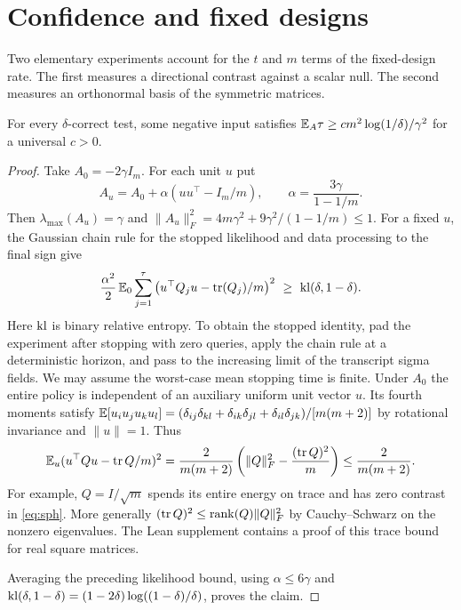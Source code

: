 \section{Confidence and fixed designs}\label{sec:fixed}

Two elementary experiments account for the \(t\) and \(m\) terms of the fixed-design rate. The first measures a directional contrast against a scalar null. The second measures an orthonormal basis of the symmetric matrices.

\begin{proposition}\label{prop:confidence}
For every \(\delta\)-correct test, some negative input satisfies
\(\mathbb E_A\tau\ge c m^2\log(1/\delta)/\gamma^2\) for a universal \(c>0\).
\end{proposition}
\begin{proof}
Take \(A_0=-2\gamma I_m\). For each unit \(u\) put
\[
 A_u=A_0+\alpha(uu^\top-I_m/m),\qquad
 \alpha=\frac{3\gamma}{1-1/m}.
\]
Then \(\lambda_{\max}(A_u)=\gamma\) and
\(\|A_u\|_F^2=4m\gamma^2+9\gamma^2/(1-1/m)\le1\).
For a fixed \(u\), the Gaussian chain rule for the stopped likelihood and data processing to the final sign give
\[
 \frac{\alpha^2}2\,\mathbb E_0\sum_{j=1}^{\tau}
 \left(u^\top Q_j u-\operatorname{tr}(Q_j)/m\right)^2
 \ \ge\ \operatorname{kl}(\delta,1-\delta).
\]
Here \(\operatorname{kl}\) is binary relative entropy. To obtain the stopped identity, pad the experiment after stopping with zero queries, apply the chain rule at a deterministic horizon, and pass to the increasing limit of the transcript sigma fields. We may assume the worst-case mean stopping time is finite. Under \(A_0\) the entire policy is independent of an auxiliary uniform unit vector \(u\). Its fourth moments satisfy
\(\mathbb E[u_i u_j u_k u_l]=(\delta_{ij}\delta_{kl}+\delta_{ik}\delta_{jl}+\delta_{il}\delta_{jk})/[m(m+2)]\)
by rotational invariance and \(\|u\|=1\). Thus
\begin{equation}\label{eq:sph}
 \mathbb E_u (u^\top Qu-\operatorname{tr} Q/m)^2
 =\frac{2}{m(m+2)}
    \left(\|Q\|_F^2-\frac{(\operatorname{tr} Q)^2}{m}\right)
 \le\frac{2}{m(m+2)} .
\end{equation}
For example, $Q=I/\sqrt m$ spends its entire energy on trace and has zero contrast in \eqref{eq:sph}. More generally $(\operatorname{tr} Q)^2\le \operatorname{rank}(Q)\|Q\|_F^2$ by Cauchy--Schwarz on the nonzero eigenvalues. The Lean supplement contains a proof of this trace bound for real square matrices.

Averaging the preceding likelihood bound, using \(\alpha\le6\gamma\) and \(\operatorname{kl}(\delta,1-\delta)=(1-2\delta)\log((1-\delta)/\delta)\), proves the claim.
\end{proof}

